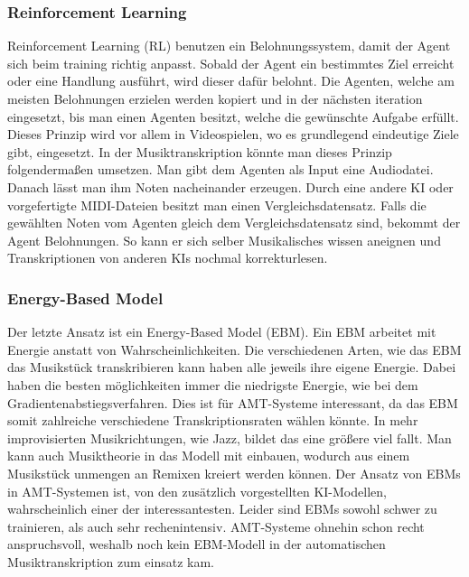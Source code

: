\subsubsection*{Reinforcement Learning}
Reinforcement Learning (RL) benutzen ein Belohnungssystem, damit der Agent sich beim training richtig anpasst.
Sobald der Agent ein bestimmtes Ziel erreicht oder eine Handlung ausführt, wird dieser dafür belohnt.
Die Agenten, welche am meisten Belohnungen erzielen werden kopiert und in der nächsten iteration eingesetzt,
bis man einen Agenten besitzt, welche die gewünschte Aufgabe erfüllt.
Dieses Prinzip wird vor allem in Videospielen, wo es grundlegend eindeutige Ziele gibt, eingesetzt.
In der Musiktranskription könnte man dieses Prinzip folgendermaßen umsetzen.
Man gibt dem Agenten als Input eine Audiodatei.
Danach lässt man ihm Noten nacheinander erzeugen.
Durch eine andere KI oder vorgefertigte MIDI-Dateien besitzt man einen Vergleichsdatensatz.
Falls die gewählten Noten vom Agenten gleich dem Vergleichsdatensatz sind, bekommt der Agent Belohnungen.
So kann er sich selber Musikalisches wissen aneignen und Transkriptionen von anderen KIs nochmal korrekturlesen.
\cite{li2018music}

\subsubsection*{Energy-Based Model}
Der letzte Ansatz ist ein Energy-Based Model (EBM).
Ein EBM arbeitet mit Energie anstatt von Wahrscheinlichkeiten.
\cite{lecun2006tutorial}
Die verschiedenen Arten, wie das EBM das Musikstück transkribieren kann haben alle jeweils ihre eigene Energie.
Dabei haben die besten möglichkeiten immer die niedrigste Energie, wie bei dem Gradientenabstiegsverfahren.
Dies ist für AMT-Systeme interessant, da das EBM somit zahlreiche verschiedene Transkriptionsraten wählen könnte.
In mehr improvisierten Musikrichtungen, wie Jazz, bildet das eine größere viel fallt.
Man kann auch Musiktheorie in das Modell mit einbauen,
wodurch aus einem Musikstück unmengen an Remixen kreiert werden können.
Der Ansatz von EBMs in AMT-Systemen ist,
von den zusätzlich vorgestellten KI-Modellen, wahrscheinlich einer der interessantesten.
Leider sind EBMs sowohl schwer zu trainieren, als auch sehr rechenintensiv.
AMT-Systeme ohnehin schon recht anspruchsvoll,
weshalb noch kein EBM-Modell in der automatischen Musiktranskription zum einsatz kam.


